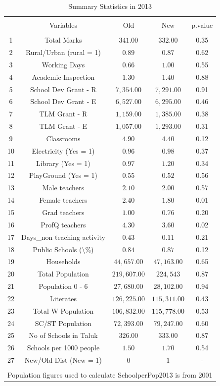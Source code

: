 \documentclass[12pt, a4paper]{article}
\begin{document}
\begin{table}[!htbp] \centering 
  \caption{Summary Statistics in 2013} 
  \label{} 
\begin{tabular}{@{\extracolsep{5pt}} ccccc} 
\\[-1.8ex]\hline 
\hline \\[-1.8ex] 
 & Variables & Old & New & p.value \\ 
\hline \\[-1.8ex] 
1 & Total Marks & $341.00$ & $332.00$ & 0.35 \\ 
2 & Rural/Urban (rural = 1) & $0.89$ & $0.87$ & 0.62 \\ 
3 & Working Days & $0.66$ & $1.00$ & 0.55 \\ 
4 & Academic Inspection & $1.30$ & $1.40$ & 0.88 \\ 
5 & School Dev Grant - R & $7,354.00$ & $7,291.00$ & 0.91 \\ 
6 & School Dev Grant - E & $6,527.00$ & $6,295.00$ & 0.46 \\ 
7 & TLM Grant - R & $1,159.00$ & $1,385.00$ & 0.38 \\ 
8 & TLM Grant - E & $1,057.00$ & $1,293.00$ & 0.31 \\ 
9 & Classrooms & $4.90$ & $4.40$ & 0.12 \\ 
10 & Electricity (Yes = 1) & $0.96$ & $0.98$ & 0.37 \\ 
11 & Library  (Yes = 1) & $0.97$ & $1.20$ & 0.34 \\ 
12 & PlayGround  (Yes = 1) & $0.55$ & $0.52$ & 0.56 \\ 
13 & Male teachers & $2.10$ & $2.00$ & 0.57 \\ 
14 & Female teachers & $2.40$ & $1.80$ & 0.01 \\ 
15 & Grad teachers & $1.00$ & $0.76$ & 0.20 \\ 
16 & ProfQ teachers & $4.30$ & $3.60$ & 0.02 \\ 
17 & Days\_non teaching activity & $0.43$ & $0.11$ & 0.21 \\ 
18 & Public Schools (\textbackslash \%) & $0.84$ & $0.87$ & 0.12 \\ 
19 & Households & $44,657.00$ & $47,163.00$ & 0.65 \\ 
20 & Total Population & $219,607.00$ & $224,543$ & 0.87 \\ 
21 & Population 0 - 6 & $27,680.00$ & $28,102.00$ & 0.94 \\ 
22 & Literates & $126,225.00$ & $115,311.00$ & 0.43 \\ 
23 & Total W Population & $106,832.00$ & $115,778.00$ & 0.53 \\ 
24 & SC/ST Population & $72,393.00$ & $79,247.00$ & 0.60 \\ 
25 & No of Schools in Taluk & $326.00$ & $333.00$ & 0.87 \\ 
26 & Schools per 1000 people & $1.50$ & $1.70$ & 0.54 \\ 
27 & New/Old Dist (New = 1) & $0$ & $1$ & - \\ 
\hline \\[-1.8ex] 
\multicolumn{5}{l}{Population figures used to calculate SchoolperPop2013 is from 2001} \\ 
\end{tabular} 
\end{table} 
\end{document}
